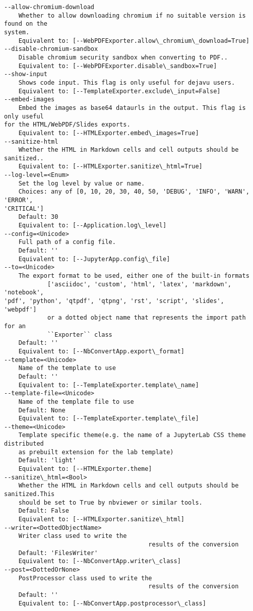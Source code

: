 \documentclass[11pt]{article}
\begin{document}
\begin{Verbatim}[commandchars=\\\{\}]
--allow-chromium-download
    Whether to allow downloading chromium if no suitable version is found on the
system.
    Equivalent to: [--WebPDFExporter.allow\_chromium\_download=True]
--disable-chromium-sandbox
    Disable chromium security sandbox when converting to PDF..
    Equivalent to: [--WebPDFExporter.disable\_sandbox=True]
--show-input
    Shows code input. This flag is only useful for dejavu users.
    Equivalent to: [--TemplateExporter.exclude\_input=False]
--embed-images
    Embed the images as base64 dataurls in the output. This flag is only useful
for the HTML/WebPDF/Slides exports.
    Equivalent to: [--HTMLExporter.embed\_images=True]
--sanitize-html
    Whether the HTML in Markdown cells and cell outputs should be sanitized..
    Equivalent to: [--HTMLExporter.sanitize\_html=True]
--log-level=<Enum>
    Set the log level by value or name.
    Choices: any of [0, 10, 20, 30, 40, 50, 'DEBUG', 'INFO', 'WARN', 'ERROR',
'CRITICAL']
    Default: 30
    Equivalent to: [--Application.log\_level]
--config=<Unicode>
    Full path of a config file.
    Default: ''
    Equivalent to: [--JupyterApp.config\_file]
--to=<Unicode>
    The export format to be used, either one of the built-in formats
            ['asciidoc', 'custom', 'html', 'latex', 'markdown', 'notebook',
'pdf', 'python', 'qtpdf', 'qtpng', 'rst', 'script', 'slides', 'webpdf']
            or a dotted object name that represents the import path for an
            ``Exporter`` class
    Default: ''
    Equivalent to: [--NbConvertApp.export\_format]
--template=<Unicode>
    Name of the template to use
    Default: ''
    Equivalent to: [--TemplateExporter.template\_name]
--template-file=<Unicode>
    Name of the template file to use
    Default: None
    Equivalent to: [--TemplateExporter.template\_file]
--theme=<Unicode>
    Template specific theme(e.g. the name of a JupyterLab CSS theme distributed
    as prebuilt extension for the lab template)
    Default: 'light'
    Equivalent to: [--HTMLExporter.theme]
--sanitize\_html=<Bool>
    Whether the HTML in Markdown cells and cell outputs should be sanitized.This
    should be set to True by nbviewer or similar tools.
    Default: False
    Equivalent to: [--HTMLExporter.sanitize\_html]
--writer=<DottedObjectName>
    Writer class used to write the
                                        results of the conversion
    Default: 'FilesWriter'
    Equivalent to: [--NbConvertApp.writer\_class]
--post=<DottedOrNone>
    PostProcessor class used to write the
                                        results of the conversion
    Default: ''
    Equivalent to: [--NbConvertApp.postprocessor\_class]

\end{Verbatim}
\end{document}
